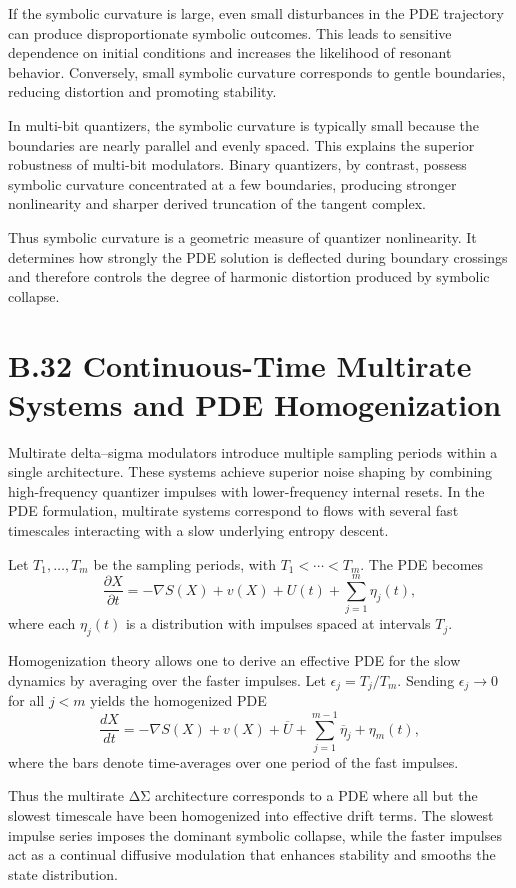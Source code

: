 If the symbolic curvature is large, even small disturbances in the PDE trajectory can produce disproportionate symbolic outcomes. This leads to sensitive dependence on initial conditions and increases the likelihood of resonant behavior. Conversely, small symbolic curvature corresponds to gentle boundaries, reducing distortion and promoting stability.

In multi-bit quantizers, the symbolic curvature is typically small because the boundaries are nearly parallel and evenly spaced. This explains the superior robustness of multi-bit modulators. Binary quantizers, by contrast, possess symbolic curvature concentrated at a few boundaries, producing stronger nonlinearity and sharper derived truncation of the tangent complex.

Thus symbolic curvature is a geometric measure of quantizer nonlinearity. It determines how strongly the PDE solution is deflected during boundary crossings and therefore controls the degree of harmonic distortion produced by symbolic collapse.

\section{B.32 Continuous-Time Multirate Systems and PDE Homogenization}

Multirate delta–sigma modulators introduce multiple sampling periods within a single architecture. These systems achieve superior noise shaping by combining high-frequency quantizer impulses with lower-frequency internal resets. In the PDE formulation, multirate systems correspond to flows with several fast timescales interacting with a slow underlying entropy descent.

Let \(T_{1},\ldots,T_{m}\) be the sampling periods, with \(T_{1} < \cdots < T_{m}\). The PDE becomes
\[
\frac{\partial X}{\partial t} 
= -\nabla S(X)
+ v(X) 
+ U(t)
+ \sum_{j=1}^{m} \eta_{j}(t),
\]
where each \(\eta_{j}(t)\) is a distribution with impulses spaced at intervals \(T_{j}\).

Homogenization theory allows one to derive an effective PDE for the slow dynamics by averaging over the faster impulses. Let \(\epsilon_{j} = T_{j}/T_{m}\). Sending \(\epsilon_{j} \to 0\) for all \(j < m\) yields the homogenized PDE
\[
\frac{dX}{dt}
= -\nabla S(X)
+ v(X)
+ \overline{U}
+ \sum_{j=1}^{m-1} \overline{\eta}_{j}
+ \eta_{m}(t),
\]
where the bars denote time-averages over one period of the fast impulses.

Thus the multirate ΔΣ architecture corresponds to a PDE where all but the slowest timescale have been homogenized into effective drift terms. The slowest impulse series imposes the dominant symbolic collapse, while the faster impulses act as a continual diffusive modulation that enhances stability and smooths the state distribution.

